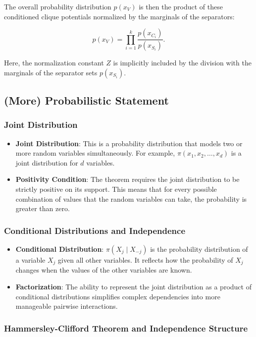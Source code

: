 \documentclass{article}
\begin{document}
The overall probability distribution \( p(x_V) \) is then the product of these conditioned clique potentials normalized by the marginals of the separators:

\[ p(x_V) = \prod_{i=1}^{k} \frac{p(x_{C_i})}{p(x_{S_i})}. \]

Here, the normalization constant \( Z \) is implicitly included by the division with the marginals of the separator sets \( p(x_{S_i}) \).

\subsection{(More) Probabilistic Statement}
\subsubsection{Joint Distribution}

\begin{itemize}
  \item \textbf{Joint Distribution}: This is a probability distribution that models two or more random variables simultaneously. For example, $\pi(x_1, x_2, \ldots, x_d)$ is a joint distribution for $d$ variables.
  \item \textbf{Positivity Condition}: The theorem requires the joint distribution to be strictly positive on its support. This means that for every possible combination of values that the random variables can take, the probability is greater than zero.
\end{itemize}

\subsubsection{Conditional Distributions and Independence}

\begin{itemize}
  \item \textbf{Conditional Distribution}: $\pi(X_j \mid X_{-j})$ is the probability distribution of a variable $X_j$ given all other variables. It reflects how the probability of $X_j$ changes when the values of the other variables are known.
  \item \textbf{Factorization}: The ability to represent the joint distribution as a product of conditional distributions simplifies complex dependencies into more manageable pairwise interactions.
\end{itemize}

\subsubsection*{Hammersley-Clifford Theorem and Independence Structure}
\end{document}
